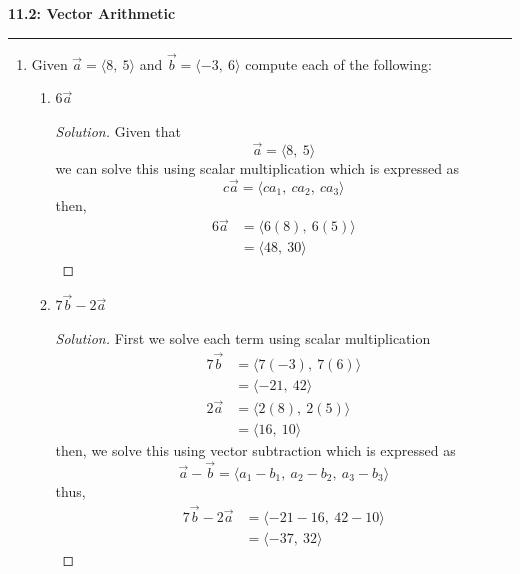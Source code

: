 \documentclass[12pt]{article}
\begin{document}
	\noindent
	{\Large \textbf{11.2: Vector Arithmetic}} \\
	\hrule
	
	\begin{enumerate}
		\item[1.)] Given \(\vec{a} = \langle 8,~5\rangle\) and \(\vec{b} = \langle -3,~6\rangle\) compute each of the following:
			\begin{enumerate}
				\item[a.)] \(6\vec{a}\)
					\begin{proof}[Solution]
						Given that
						\[\vec{a} = \langle 8,~5\rangle\]
						we can solve this using scalar multiplication which is expressed as
						\[c\vec{a} = \langle ca_1,~ca_2,~ca_3\rangle\]
						then,
						\begin{align*}
							6\vec{a} & = \langle 6\left(8\right),~6\left(5\right)\rangle \\
							& = \langle 48,~30\rangle
						\end{align*}
					\end{proof}
				
				\item[b.)] \(7\vec{b} - 2\vec{a}\)
					\begin{proof}[Solution]
						First we solve each term using scalar multiplication
						\begin{align*}
							7\vec{b} & = \langle 7\left(-3\right),~7\left(6\right)\rangle \\
							& = \langle -21,~42\rangle \\
							2\vec{a} & = \langle 2\left(8\right),~2\left(5\right)\rangle \\
							& = \langle 16,~10\rangle
						\end{align*}
						then, we solve this using vector subtraction which is expressed as
						\[\vec{a}-\vec{b} = \langle a_1-b_1,~a_2-b_2,~a_3-b_3\rangle\]
						thus,
						\begin{align*}
							7\vec{b}-2\vec{a} & = 	\langle -21-16,~42-10\rangle \\
							& = \langle -37,~32\rangle
						\end{align*}
					\end{proof}
				

\end{enumerate}
\end{enumerate}
\end{document}

